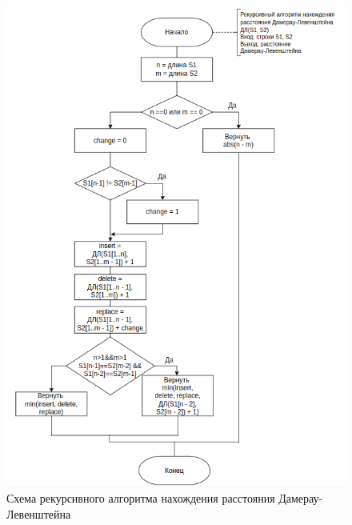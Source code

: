 \begin{figure}[h]
	\centering
	\includegraphics[width=\textwidth]{img/dlrec.png}
	\caption{Схема рекурсивного алгоритма нахождения расстояния Дамерау-Левенштейна}
	\label{fig:DLrec}
\end{figure}

\clearpage


